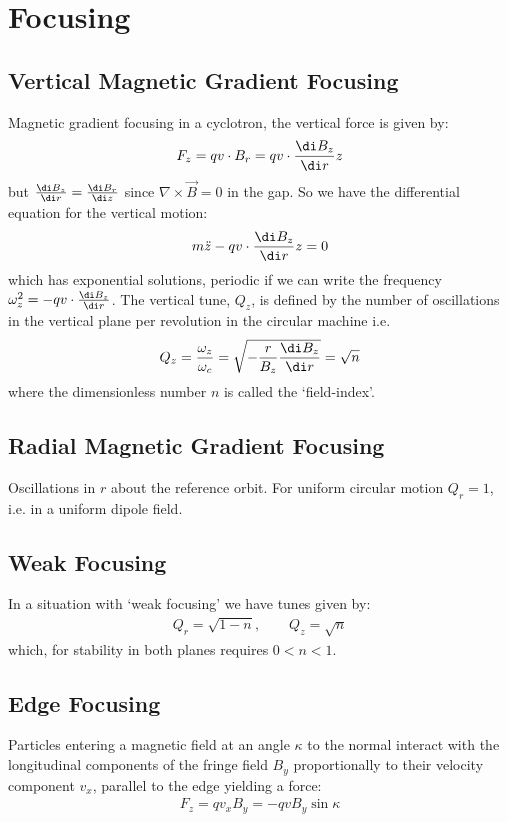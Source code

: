 \documentclass{article}
\numberwithin{equation}{section}
\begin{document}
\section{Focusing}

\subsection{Vertical Magnetic Gradient Focusing}
Magnetic gradient focusing in a cyclotron, the vertical force is given by:
\begin{align}
F_z = q v \cdot B_r = q v \cdot \frac{\di B_z}{\di r} z
\end{align}
but $\frac{\di B_z}{\di r} = \frac{\di B_r}{\di z}$ since $\nabla \times \vec{B} = 0$ in the gap. So we have the differential equation for the vertical motion:
\begin{align}
m \ddot{z} - q v \cdot \frac{\di B_z}{\di r}z = 0
\end{align}
which has exponential solutions, periodic if we can write the frequency $\omega_z^2 = -qv \cdot \frac{\di B_z}{\di r}$.
The vertical tune, $Q_z$, is defined by the number of oscillations in the vertical plane per revolution in the circular machine i.e.
\begin{align}
Q_z = \frac{\omega_z}{\omega_c} = \sqrt{-\frac{r}{B_z} \frac{\di B_z}{\di r}} = \sqrt{n}
\end{align}
where the dimensionless number $n$ is called the `field-index'.

\subsection{Radial Magnetic Gradient Focusing}

Oscillations in $r$ about the reference orbit. For uniform circular motion $Q_r = 1$, i.e. in a uniform dipole field. 

\subsection{Weak Focusing}
In a situation with `weak focusing' we have tunes given by:
\begin{align}
Q_r = \sqrt{1-n}, \qquad Q_z = \sqrt{n}
\end{align}
which, for stability in both planes requires $0< n < 1$.

\subsection{Edge Focusing}
Particles entering a magnetic field at an angle $\kappa$ to the normal interact with the longitudinal components of the fringe field $B_y$ proportionally to their velocity component $v_x$, parallel to the edge yielding a force:
\begin{align}
F_z = q v_x B_y = -qvB_y \sin \kappa
\end{align}
\end{document}
